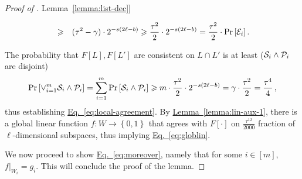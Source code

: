 \documentclass[11pt]{article}
\numberwithin{equation}{section}
\theoremstyle{definition}
\theoremstyle{plain}
\newcommand{\expref}[2]{\hyperref[#2]{#1~\ref{#2}}}
\newcommand{\expeqref}[2]{\hyperref[#2]{#1~\eqref{#2}}}
\newcommand\set[1]{{\left\{ #1 \right\}}}
\newcommand\Prob[2]{{\Pr_{#1}\left[ {#2} \right]}}
\newcommand\power[1]{\set{0,1}^{#1}}
\renewcommand\geq{\geqslant}
\begin{document}
\begin{proof}[Proof of \expref{Lemma}{lemma:list-dec}]
\begin{itemize}
\begin{eqnarray*}
 &\geq& (\tau^2 - \gamma)\cdot 2^{-s(2\ell-b)} \geq \frac{\tau^2}{2} \cdot  2^{-s(2\ell-b)} = \frac{\tau^2}{2}
  \cdot \Prob{}{{\cal E}_i}\,.
  \end{eqnarray*}
\end{itemize}
The probability that $F[L], F[L']$ are consistent on $L \cap L'$ is at least ($  {\cal S}_i \wedge {\cal P}_i  $ are disjoint)
\begin{equation}\label{eqn:key-1}
 \Prob{}{\vee_{i=1}^m {\cal S}_i \wedge {\cal P}_i} = \sum_{i=1}^m \Prob{}{{\cal S}_i \wedge {\cal P}_i } \geq m \cdot \frac{\tau^2}{2} \cdot  2^{-s(2\ell-b)} = \gamma \cdot \frac{\tau^2}{2} = \frac{\tau^4}{4}\,,
\end{equation}
thus establishing \expeqref{Eq.}{eq:local-agreement}.
By \expref{Lemma}{lemma:lin-aux-1}, there is a global linear function $f:W \to \power{}$ that agrees with $F[\cdot]$ on $\frac{\tau^{12}}{2000}$ fraction of $\ell$-dimensional subspaces, thus implying \expeqref{Eq.}{eq:globlin}.

We now proceed to show \expeqref{Eq.}{eq:moreover}, namely that for some $i\in[m]$, $f|_{W_i}=g_i$. This will conclude the proof of the lemma.


\end{proof}
\end{document}
